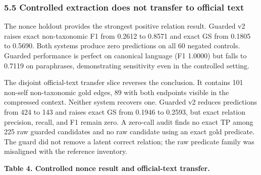 \documentclass[
]{article}
\begin{document}
\subsubsection{5.5 Controlled extraction does not transfer to official
text}\label{controlled-extraction-does-not-transfer-to-official-text}

The nonce holdout provides the strongest positive relation result.
Guarded v2 raises exact non-taxonomic F1 from 0.2612 to 0.8571 and exact
GS from 0.1805 to 0.5690. Both systems produce zero predictions on all
60 negated controls. Guarded performance is perfect on canonical
language (F1 1.0000) but falls to 0.7119 on paraphrases, demonstrating
sensitivity even in the controlled setting.

The disjoint official-text transfer slice reverses the conclusion. It
contains 101 non-self non-taxonomic gold edges, 89 with both endpoints
visible in the compressed context. Neither system recovers one. Guarded
v2 reduces predictions from 424 to 143 and raises exact GS from 0.1946
to 0.2593, but exact relation precision, recall, and F1 remain zero. A
zero-call audit finds no exact TP among 225 raw guarded candidates and
no raw candidate using an exact gold predicate. The guard did not remove
a latent correct relation; the raw predicate family was misaligned with
the reference inventory.

\textbf{Table 4. Controlled nonce result and official-text transfer.}
\end{document}
